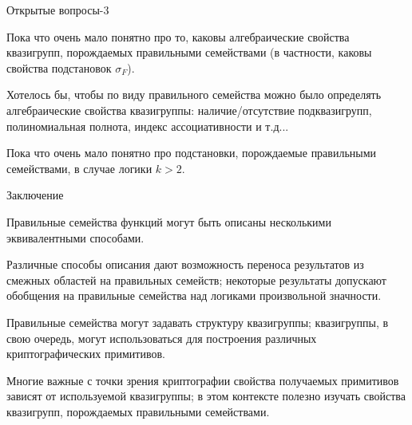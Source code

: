 \begin{frame}{Открытые вопросы-3}
    \begin{coloritemize}
        \item Пока что очень мало понятно про то, каковы алгебраические свойства квазигрупп, порождаемых правильными семействами (в частности, каковы свойства подстановок $\sigma_F$).
        \pause 
        \item Хотелось бы, чтобы по виду правильного семейства можно было определять алгебраические свойства квазигруппы: наличие/отсутствие подквазигрупп, полиномиальная полнота, индекс ассоциативности и т.д...
        \pause 
        \item Пока что очень мало понятно про подстановки, порождаемые правильными семействами, в случае логики $k > 2$.
    \end{coloritemize}
\end{frame}


\begin{frame}{Заключение}
    \begin{coloritemize}
        \item Правильные семейства функций могут быть описаны несколькими эквивалентными способами.
        \pause 
        \item Различные способы описания дают возможность переноса результатов из смежных областей на  правильных семейств; некоторые результаты допускают обобщения на правильные семейства над логиками произвольной значности.
        \pause 
        \item Правильные семейства могут задавать структуру квазигруппы; квазигруппы, в свою очередь, могут использоваться для построения различных криптографических примитивов.
        \pause 
        \item Многие важные с точки зрения криптографии свойства получаемых примитивов зависят от используемой квазигруппы; в этом контексте полезно изучать свойства квазигрупп, порождаемых правильными семействами.
    \end{coloritemize}
\end{frame}




